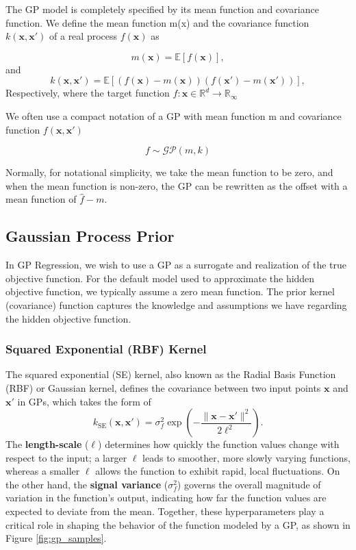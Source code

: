 \documentclass{ut-thesis}
\begin{document}
The GP model is completely specified by its mean function and covariance function. We define the mean function m(x) and the covariance function $k(\mathbf{x},\mathbf{x'})$ of a real process $f(\mathbf{x})$ as

\begin{equation}
    m(\mathbf{x}) = \mathbb{E}[f(\mathbf{x})],
\end{equation}
and 
\begin{equation}
    k(\mathbf{x}, \mathbf{x}') = \mathbb{E}[(f(\mathbf{x}) - m(\mathbf{x}))(f(\mathbf{x}') - m(\mathbf{x}'))],
\end{equation}
Respectively, where the target function $f : \mathbf{x} \in \mathbb{R}^d \to \mathbb{R}_\infty$

We often use a compact notation of a GP with mean function m and covariance function $f(\mathbf{x},\mathbf{x'})$

\begin{equation}
    f\sim \mathcal{GP} (m,k)
\end{equation}

Normally, for notational simplicity, we take the mean function to be zero, and when the mean function is non-zero, the GP can be rewritten as the offset with a mean function of $\hat{f} - m$.

\subsection{Gaussian Process Prior}
In GP Regression, we wish to use a GP as a surrogate and realization of the true objective function. For the default model used to approximate the hidden objective function, we typically assume a zero mean function. The prior kernel (covariance) function captures the knowledge and assumptions we have regarding the hidden objective function. 

\subsubsection{Squared Exponential (RBF) Kernel}

The squared exponential (SE) kernel, also known as the Radial Basis Function (RBF) or Gaussian kernel, defines the covariance between two input points $\mathbf{x}$ and $\mathbf{x'}$  in GPs\cite{rasmussen2006gaussian}, which takes the form of
\begin{equation}
    k_{\text{SE}}(\mathbf{x}, \mathbf{x'}) = \sigma_f^2 \exp\left( -\frac{\|\mathbf{x} - \mathbf{x'}\|^2}{2\ell^2} \right).
\end{equation}
The \textbf{length-scale} (\(\ell\)) determines how quickly the function values change with respect to the input; a larger \(\ell\) leads to smoother, more slowly varying functions, whereas a smaller \(\ell\) allows the function to exhibit rapid, local fluctuations. On the other hand, the \textbf{signal variance} (\(\sigma_f^2\)) governs the overall magnitude of variation in the function's output, indicating how far the function values are expected to deviate from the mean. Together, these hyperparameters play a critical role in shaping the behavior of the function modeled by a GP, as shown in Figure \ref{fig:gp_samples}.
\end{document}
